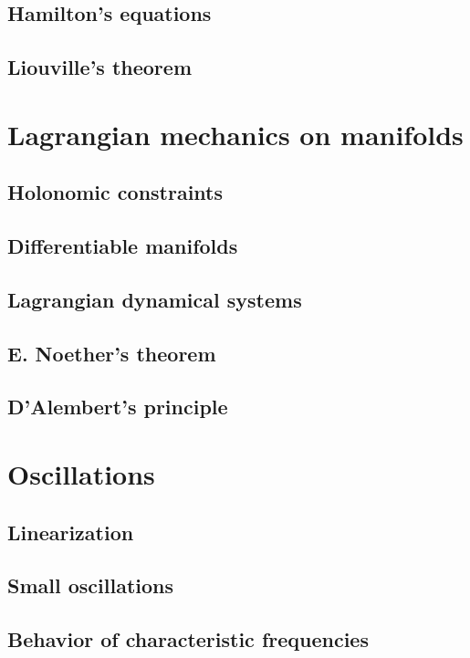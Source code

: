 \documentclass{book}
\numberwithin{equation}{section}
\theoremstyle{plain}
\theoremstyle{definition}
\theoremstyle{remark}
\theoremstyle{smallcap}
\numberwithin{prob}{section}
\begin{document}
\section{Hamilton's equations}

\section{Liouville's theorem}

\chapter{Lagrangian mechanics on manifolds}

\section{Holonomic constraints}

\section{Differentiable manifolds}

\section{Lagrangian dynamical systems}

\section{E. Noether's theorem}

\section{D'Alembert's principle}

\chapter{Oscillations}

\section{Linearization}

\section{Small oscillations}

\section{Behavior of characteristic frequencies}
\end{document}

